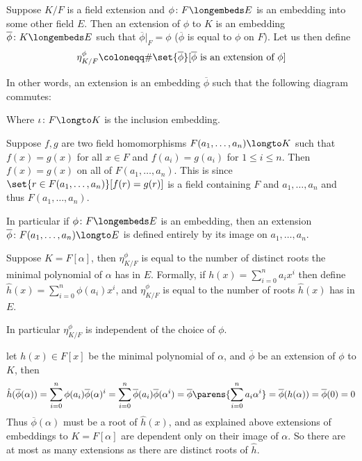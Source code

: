 \bdefn

    Suppose $K/F$ is a field extension and $\phi\colon F\longembeds E$ is an embedding into some other field $E$.
    Then an {\emphcolor extension} of $\phi$ to $K$ is an embedding $\overline\phi\colon K\longembeds E$ such that $\overline\phi\bigl|_F=\phi$ ($\overline\phi$ is equal to $\phi$ on $F$).
    Let us then define
    $$ \eta^\phi_{K/F} \coloneqq \#\set{\overline\phi}[\hbox{$\overline\phi$ is an extension of $\phi$}] $$

\edefn

In other words, an extension is an embedding $\overline\phi$ such that the following diagram commutes:

\medskip
\centerline{}
\medskip

Where $\iota\colon F\longto K$ is the inclusion embedding.

Suppose $f,g$ are two field homomorphisms $F(a_1,\dots,a_n)\longto K$ such that $f(x)=g(x)$ for all $x\in F$ and $f(a_i)=g(a_i)$ for $1\leq i\leq n$.
Then $f(x)=g(x)$ on all of $F(a_1,\dots,a_n)$.
This is since $\set{r\in F(a_1,\dots,a_n)}[f(r)=g(r)]$ is a field containing $F$ and $a_1,\dots,a_n$ and thus $F(a_1,\dots,a_n)$.

In particular if $\phi\colon F\longembeds E$ is an embedding, then an extension $\overline\phi\colon F(a_1,\dots,a_n)\longto E$ is defined entirely by its image on $a_1,\dots,a_n$.

\bprop

    Suppose $K=F[\alpha]$, then $\eta_{K/F}^\phi$ is equal to the number of distinct roots the minimal polynomial of $\alpha$ has in $E$.
    Formally, if $h(x)=\sum_{i=0}^na_ix^i$ then define $\hat h(x)=\sum_{i=0}^n\phi(a_i)x^i$, and $\eta_{K/F}^\phi$ is equal to the number of roots $\hat h(x)$ has in $E$.

    In particular $\eta_{K/F}^\phi$ is independent of the choice of $\phi$.

\eprop

\Proof let $h(x)\in F[x]$ be the minimal polynomial of $\alpha$, and $\overline\phi$ be an extension of $\phi$ to $K$, then
$$ \hat h(\overline\phi(\alpha)) = \sum_{i=0}^n\phi(a_i)\overline\phi(\alpha)^i = \sum_{i=0}^n\overline\phi(a_i)\overline\phi(\alpha^i) = \overline\phi\parens{\sum_{i=0}^na_i\alpha^i} =
\overline\phi(h(\alpha)) = \overline\phi(0) = 0 $$
Thus $\overline\phi(\alpha)$ must be a root of $\hat h(x)$, and as explained above extensions of embeddings to $K=F[\alpha]$ are dependent only on their image of $\alpha$. 
So there are at most as many extensions as there are distinct roots of $\hat h$.

